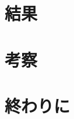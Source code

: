 \documentclass[
  12pt,
  titlepage,
  draft]{ltjsarticle}
\begin{document}
\hypertarget{ux7d50ux679c}{%
\section{結果}\label{ux7d50ux679c}}

\lipsum[1-4]

\hypertarget{ux8003ux5bdf}{%
\section{考察}\label{ux8003ux5bdf}}

\lipsum[1-4]

\hypertarget{ux7d42ux308fux308aux306b}{%
\section{終わりに}\label{ux7d42ux308fux308aux306b}}

\lipsum[5-5]

\printbibliography
\end{document}
